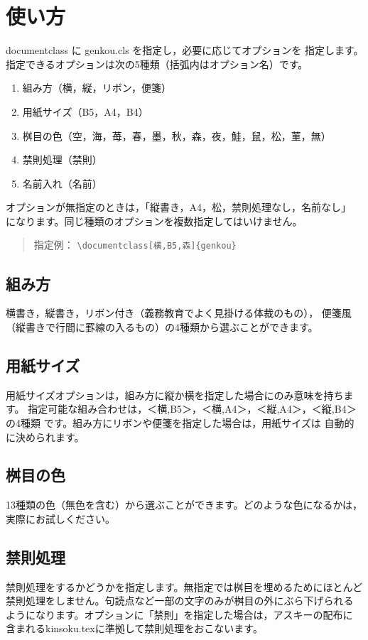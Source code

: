 \documentclass{jarticle}
\begin{document}
\section{使い方}
documentclass に genkou.cls を指定し，必要に応じてオプションを
指定します。指定できるオプションは次の5種類（括弧内はオプション名）です。

\begin{enumerate}
\item 組み方（横，縦，リボン，便箋）
\item 用紙サイズ（B5，A4，B4）
\item 桝目の色（空，海，苺，春，墨，秋，森，夜，鮭，鼠，松，菫，無）
\item 禁則処理（禁則）
\item 名前入れ（名前）
\end{enumerate}

オプションが無指定のときは，「縦書き，A4，松，禁則処理なし，名前なし」
になります。同じ種類のオプションを複数指定してはいけません。

\begin{verse}
指定例： \verb+\documentclass[横,B5,森]{genkou}+
\end{verse}

\subsection{組み方}
横書き，縦書き，リボン付き（義務教育でよく見掛ける体裁のもの），
便箋風（縦書きで行間に罫線の入るもの）の4種類から選ぶことができます。

\subsection{用紙サイズ}
用紙サイズオプションは，組み方に縦か横を指定した場合にのみ意味を持ちます。
指定可能な組み合わせは，＜横,B5＞，＜横,A4＞，＜縦,A4＞，＜縦,B4＞の4種類
です。組み方にリボンや便箋を指定した場合は，用紙サイズは
自動的に決められます。

\subsection{桝目の色}
13種類の色（無色を含む）から選ぶことができます。どのような色になるかは，
実際にお試しください。

\subsection{禁則処理}
禁則処理をするかどうかを指定します。無指定では桝目を埋めるためにほとんど
禁則処理をしません。句読点など一部の文字のみが桝目の外にぶら下げられる
ようになります。オプションに「禁則」を指定した場合は，アスキーの配布に
含まれるkinsoku.texに準拠して禁則処理をおこないます。
\end{document}
